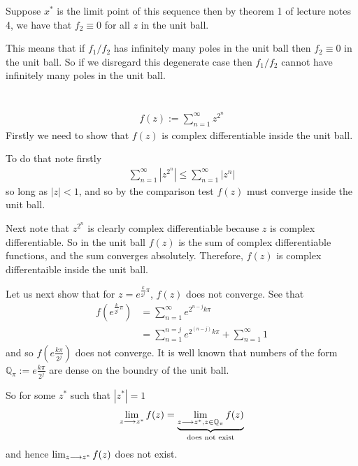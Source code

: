 \documentclass{unswmaths}
\begin{document}
Suppose $ x^* $ is the limit point of this sequence then by theorem 1 of lecture notes 4, we have that $ f_2 \equiv 0 $ for all $ z $ in the unit ball. 

This means that if $ f_1 / f_2 $ has infinitely many poles in the unit ball then $ f_2 \equiv 0 $ in the unit ball. So if we disregard this degenerate case then $ f_1 / f_2 $ cannot have infinitely many poles in the unit ball.

\section{}

\section{}

\section{}
\begin{align*}
    f(z) := \sum_{n=1}^\infty z^{2^n}
\end{align*}
Firstly we need to show that $ f(z) $ is complex differentiable inside the unit ball.

To do that note firstly
\begin{align*}
    \sum_{n=1}^\infty \left| z^{2^n} \right| \leq \sum_{n=1}^\infty |z^n| 
\end{align*}
so long as $ |z| < 1 $, and so by the comparison test $ f(z) $ must converge inside the unit ball.

Next note that $ z^{2^n} $ is clearly complex differentiable because $ z $ is complex differentiable. 
So in the unit ball $ f(z) $ is the sum of complex differentiable functions, and the sum converges absolutely. Therefore, $ f(z) $ is complex differentaible inside the unit ball.

Let us next show that for $ z = e^{\frac{k}{2^j} \pi} $, $f(z) $ does not converge. 
See that
\begin{align*}
    f(e^{\frac{k}{2^j}\pi}) &= \sum_{n=1}^\infty e^{2^{n-j} k\pi} \\
        &= \sum_{n=1}^{n=j} e^{2^(n-j)k\pi} + \sum_{n=1}^\infty 1
\end{align*}
and so $ f(e\frac{k\pi}{2^j}) $ does not converge. It is well known that numbers of the form $ \mathbb{Q}_{\pi} := e\frac{k\pi}{2^j} $ are dense on the boundry of the unit ball. 

So for some $ z^* $ such that $ |z^*| = 1 $
\begin{align*}
    \lim_{z\longrightarrow z^*} f(z) = \underbrace{\lim_{z \longrightarrow z^*, z \in \mathbb{Q}_{\pi}} f(z)}_{\text{does not exist}}
\end{align*}
and hence $ \lim_{z \longrightarrow z^*}f(z) $ does not exist. 
\end{document}

